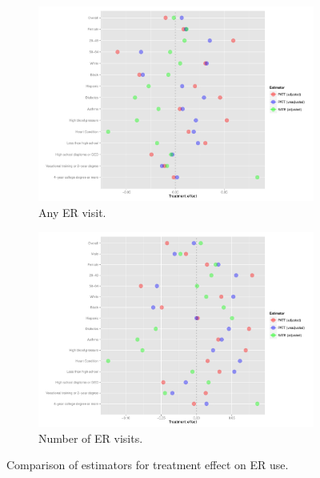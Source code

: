 \documentclass[12pt]{article}
\begin{document}
\begin{figure} [b]
\begin{center}
  \begin{subfigure}[b]{0.86\textwidth}
    \includegraphics[width=\textwidth]{any-visit-plot.pdf}
    \caption{Any ER visit.}
    \label{fig:any-visit-plot}
  \end{subfigure}
  \begin{subfigure}[b]{0.86\textwidth}
    \includegraphics[width=\textwidth]{num-visit-plot.pdf}
    \caption{Number of ER visits.}
    \label{fig:num-visit-plot}
  \end{subfigure}
 \caption{Comparison of estimators for treatment effect on ER use.}
  \end{center}
\end{figure}
\end{document}
